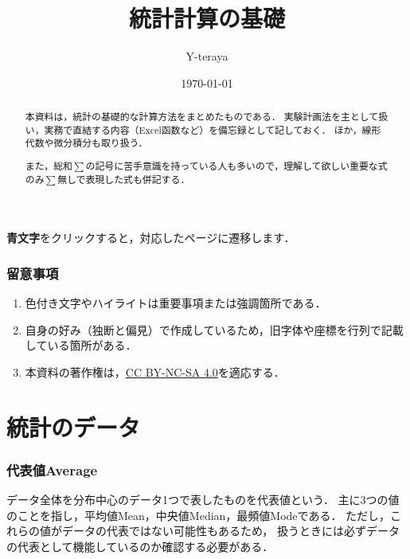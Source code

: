 \documentclass[a4paper,11pt]{ltjsarticle}
\title{\textbf{統計計算の基礎}}
\author{Y-teraya}
\date{\today}
\numberwithin{equation}{section}
\renewcommand{\cite}[1]{\textsuperscript{\citep{#1}}}
\begin{document}
\maketitle

\begin{abstract}
  本資料は，統計の基礎的な計算方法をまとめたものである．
  実験計画法を主として扱い，実務で直結する内容（Excel函数など）を備忘録として記しておく．
  ほか，線形代数や微分積分も取り扱う．

  また，総和$\sum$の記号に苦手意識を持っている人も多いので，理解して欲しい重要な式のみ$\sum$無しで表現した式も併記する．
\end{abstract}

\tableofcontents

\vspace{12pt}

\begin{center}
  \textbf{\color{blue}青文字}をクリックすると，対応したページに遷移します．
\end{center}

\clearpage

\section*{留意事項}

\begin{enumerate}
  \item 色付き文字やハイライトは重要事項または強調箇所である．
  \item 自身の好み（独断と偏見）で作成しているため，旧字体や座標を行列で記載している箇所がある．
  \item 本資料の著作権は，\href{https://creativecommons.org/licenses/by-nc-sa/4.0}{CC BY-NC-SA 4.0}を適応する．
\end{enumerate}

\clearpage

\part{統計のデータ}
\label{part: statistics}

\section{代表値Average}
\label{sec: average}

データ全体を分布中心のデータ1つで表したものを代表値という．
主に3つの値のことを指し，平均値Mean，中央値Median，最頻値Modeである．
ただし，これらの値がデータの代表ではない可能性もあるため，
扱うときには必ずデータの代表として機能しているのか確認する必要がある\cite{ave-1, ave-2}．
\end{document}
